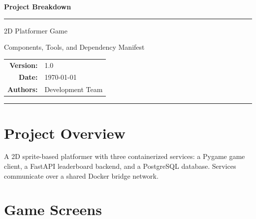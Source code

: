 \documentclass[12pt, letterpaper]{article}
\begin{document}
\begin{titlepage}
    \centering
    \vspace*{3cm}
    {\Huge\bfseries Project Breakdown\par}
    \vspace{0.4cm}
    \rule{\linewidth}{0.5pt}
    \vspace{0.4cm}
    {\LARGE 2D Platformer Game\par}
    \vspace{0.3cm}
    {\large Components, Tools, and Dependency Manifest\par}
    \vspace{2cm}
    \begin{tabular}{rl}
        \textbf{Version:} & 1.0 \\[4pt]
        \textbf{Date:}    & \today \\[4pt]
        \textbf{Authors:} & Development Team \\
    \end{tabular}
    \vfill
    \rule{\linewidth}{0.5pt}
\end{titlepage}

\newpage
\tableofcontents
\newpage

\section{Project Overview}

A 2D sprite-based platformer with three containerized services: a Pygame game client, a FastAPI leaderboard backend, and a PostgreSQL database. Services communicate over a shared Docker bridge network.

\section{Game Screens}
\end{document}
